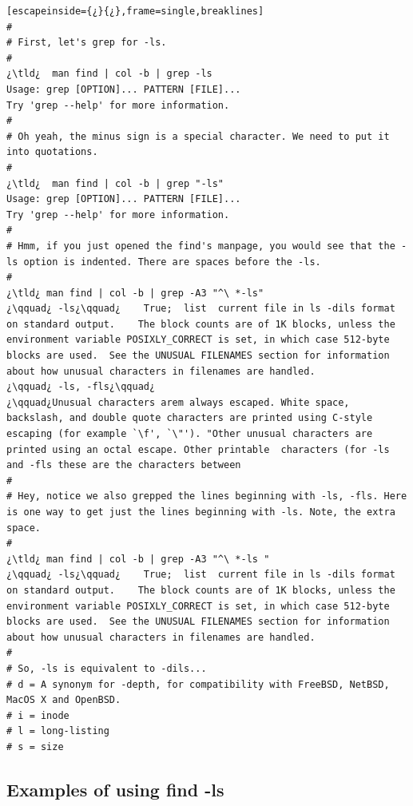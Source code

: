 \begin{lstlisting}[escapeinside={¿}{¿},frame=single,breaklines]
#
# First, let's grep for -ls.
#
¿\tld¿  man find | col -b | grep -ls
Usage: grep [OPTION]... PATTERN [FILE]...
Try 'grep --help' for more information.
#
# Oh yeah, the minus sign is a special character. We need to put it into quotations.
#
¿\tld¿  man find | col -b | grep "-ls"
Usage: grep [OPTION]... PATTERN [FILE]...
Try 'grep --help' for more information.
#
# Hmm, if you just opened the find's manpage, you would see that the -ls option is indented. There are spaces before the -ls.
#
¿\tld¿ man find | col -b | grep -A3 "^\ *-ls"
¿\qquad¿ -ls¿\qquad¿    True;  list  current file in ls -dils format on standard output.	The block counts are of 1K blocks, unless the environment variable POSIXLY_CORRECT is set, in which case 512-byte blocks are used.  See the UNUSUAL FILENAMES section for information about how unusual characters in filenames are handled.
¿\qquad¿ -ls, -fls¿\qquad¿
¿\qquad¿Unusual characters arem always escaped. White space, backslash, and double quote characters are printed using C-style escaping (for example `\f', `\"'). "Other unusual characters are printed using an octal escape. Other printable  characters (for -ls and -fls these are the characters between
#
# Hey, notice we also grepped the lines beginning with -ls, -fls. Here is one way to get just the lines beginning with -ls. Note, the extra space.
#
¿\tld¿ man find | col -b | grep -A3 "^\ *-ls "
¿\qquad¿ -ls¿\qquad¿    True;  list  current file in ls -dils format on standard output.	The block counts are of 1K blocks, unless the environment variable POSIXLY_CORRECT is set, in which case 512-byte blocks are used.  See the UNUSUAL FILENAMES section for information about how unusual characters in filenames are handled.
#
# So, -ls is equivalent to -dils...
# d = A synonym for -depth, for compatibility with FreeBSD, NetBSD, MacOS X and OpenBSD.
# i = inode
# l = long-listing
# s = size     
\end{lstlisting}

\subsection{Examples of using find -ls}

